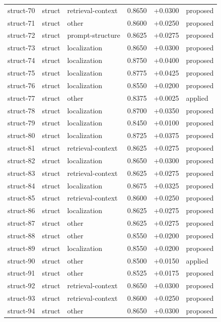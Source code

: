 \begin{center}
\begin{longtable}{llp{5.2cm}rrl}
struct-70 & struct & retrieval-context & 0.8650 & +0.0300 & proposed \\
struct-71 & struct & other & 0.8600 & +0.0250 & proposed \\
struct-72 & struct & prompt-structure & 0.8625 & +0.0275 & proposed \\
struct-73 & struct & localization & 0.8650 & +0.0300 & proposed \\
struct-74 & struct & localization & 0.8750 & +0.0400 & proposed \\
struct-75 & struct & localization & 0.8775 & +0.0425 & proposed \\
struct-76 & struct & localization & 0.8550 & +0.0200 & proposed \\
struct-77 & struct & other & 0.8375 & +0.0025 & applied \\
struct-78 & struct & localization & 0.8700 & +0.0350 & proposed \\
struct-79 & struct & localization & 0.8450 & +0.0100 & proposed \\
struct-80 & struct & localization & 0.8725 & +0.0375 & proposed \\
struct-81 & struct & retrieval-context & 0.8625 & +0.0275 & proposed \\
struct-82 & struct & localization & 0.8650 & +0.0300 & proposed \\
struct-83 & struct & retrieval-context & 0.8625 & +0.0275 & proposed \\
struct-84 & struct & localization & 0.8675 & +0.0325 & proposed \\
struct-85 & struct & retrieval-context & 0.8600 & +0.0250 & proposed \\
struct-86 & struct & localization & 0.8625 & +0.0275 & proposed \\
struct-87 & struct & other & 0.8625 & +0.0275 & proposed \\
struct-88 & struct & other & 0.8550 & +0.0200 & proposed \\
struct-89 & struct & localization & 0.8550 & +0.0200 & proposed \\
struct-90 & struct & other & 0.8500 & +0.0150 & applied \\
struct-91 & struct & other & 0.8525 & +0.0175 & proposed \\
struct-92 & struct & retrieval-context & 0.8650 & +0.0300 & proposed \\
struct-93 & struct & retrieval-context & 0.8600 & +0.0250 & proposed \\
struct-94 & struct & other & 0.8650 & +0.0300 & proposed \\

\end{longtable}
\end{center}
